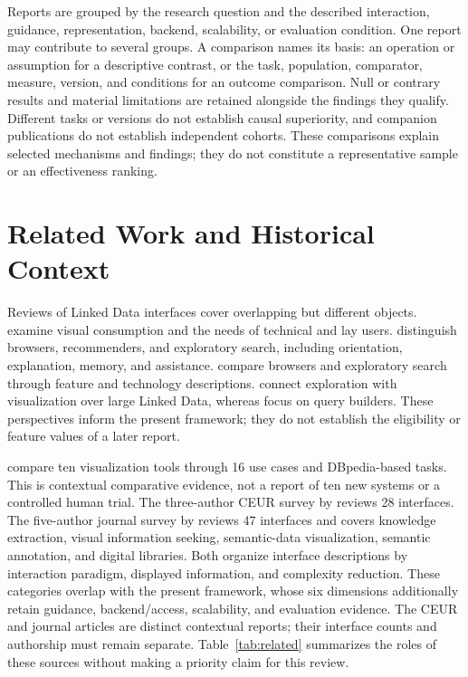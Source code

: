 \documentclass[manuscript,review,screen]{acmart}
\begin{document}
Reports are grouped by the research question and the described interaction, guidance, representation, backend, scalability, or evaluation condition. One report may contribute to several groups. A comparison names its basis: an operation or assumption for a descriptive contrast, or the task, population, comparator, measure, version, and conditions for an outcome comparison. Null or contrary results and material limitations are retained alongside the findings they qualify. Different tasks or versions do not establish causal superiority, and companion publications do not establish independent cohorts. These comparisons explain selected mechanisms and findings; they do not constitute a representative sample or an effectiveness ranking.

\section{Related Work and Historical Context}
Reviews of Linked Data interfaces cover overlapping but different objects. \citet{2011_Dadzie_Approaches_to} examine visual consumption and the needs of technical and lay users. \citet{2014_Marie_Survey_of} distinguish browsers, recommenders, and exploratory search, including orientation, explanation, memory, and assistance. \citet{2016_Jacksi_State_of} compare browsers and exploratory search through feature and technology descriptions. \citet{2016_Bikakis_Exploration_and} connect exploration with visualization over large Linked Data, whereas \citet{2016_Grafkin_SPARQL_Query} focus on query builders. These perspectives inform the present framework; they do not establish the eligibility or feature values of a later report.

\citet{2020_Desimoni_A_Comparative} compare ten visualization tools through 16 use cases and DBpedia-based tasks. This is contextual comparative evidence, not a report of ten new systems or a controlled human trial. The three-author CEUR survey by \citet{2023_Bernasconi_Linked_Data} reviews 28 interfaces. The five-author journal survey by \citet{2023_Bernasconi_Linked_Data_Journal} reviews 47 interfaces and covers knowledge extraction, visual information seeking, semantic-data visualization, semantic annotation, and digital libraries. Both organize interface descriptions by interaction paradigm, displayed information, and complexity reduction. These categories overlap with the present framework, whose six dimensions additionally retain guidance, backend/access, scalability, and evaluation evidence. The CEUR and journal articles are distinct contextual reports; their interface counts and authorship must remain separate. Table~\ref{tab:related} summarizes the roles of these sources without making a priority claim for this review.
\end{document}
